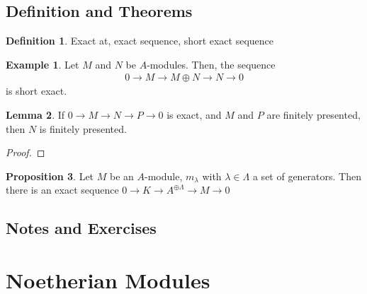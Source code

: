 \documentclass[a4paper]{book}
\theoremstyle{definition}
\newtheorem{definition}{Definition}[]
\newtheorem{example}{Example}[definition]
\newtheorem{lemma}[definition]{Lemma}
\newtheorem{proposition}[definition]{Proposition}
\begin{document}
\section{Definition and Theorems}

\begin{defbox}
    \begin{definition}
        Exact at, exact sequence, short exact sequence    
    \end{definition}
\end{defbox}

\begin{exmbox}
    \begin{example}
        Let \(M\) and \(N\) be \(A\)-modules. Then, the sequence
        \begin{align*}
            0 \rightarrow M \rightarrow M \oplus N \rightarrow N \rightarrow 0
        \end{align*}
        is short exact.
    \end{example}
\end{exmbox}

\begin{thmbox}
    \begin{lemma}
        If \(0 \rightarrow M \rightarrow N \rightarrow P \rightarrow 0\) is exact, and \(M\) and \(P\) are finitely presented, then \(N\) is finitely presented.
    \end{lemma}
\end{thmbox}

\begin{proof}
    
\end{proof}

\begin{thmbox}
    \begin{proposition}
        Let \(M\) be an \(A\)-module, \(m_\lambda\) with \(\lambda \in \Lambda\) a set of generators. Then there is an exact sequence \(0 \rightarrow K \rightarrow A^{\oplus \Lambda} \rightarrow M \rightarrow 0\)
    \end{proposition}
\end{thmbox}



\section{Notes and Exercises}




\chapter{Noetherian Modules}
\end{document}
